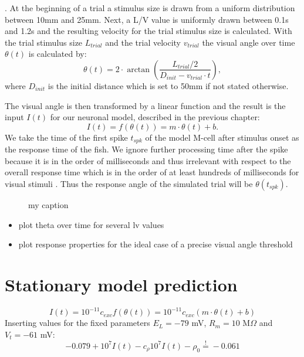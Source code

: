 \documentclass[a4paper,10pt,hidelinks]{scrreprt}
\begin{document}
	\cite{Bhattacharyya2017}.
	At the beginning of a trial a stimulus size is drawn from a uniform distribution between 10mm 
	and 25mm.
	Next, a L/V value is uniformly drawn between 0.1s and 1.2s and the resulting velocity for the 
	trial stimulus size is calculated.
	With the trial stimulus size $L_{trial}$ and the trial velocity $v_{trial}$ the visual angle 
	over time $\theta(t)$ is calculated by:
	\begin{equation}
	\theta (t) = 2\cdot \arctan(\frac{L_{trial}/2}{D_{init} - v_{trial}\cdot t}),
	\label{eq:theta}
	\end{equation}
	where $D_{init}$ is the initial distance which is set to 50mm if not stated otherwise.
	
	The visual angle is then transformed by a linear function and the result is the input $I(t)$ 
	for our neuronal model, described in the previous chapter:
	\begin{equation}
	I(t) = f(\theta (t)) = m \cdot \theta(t) + b.
	\label{eq:input}
	\end{equation}
	We take the time of the first spike $t_{spk}$ of the model M-cell after stimulus onset as the 
	response time of the fish.
	We ignore further processing time after the spike because it is in the order of milliseconds 
	\citep{Preuss2003} and thus irrelevant with respect to the overall response time which is in 
	the order of at least hundreds of milliseconds for visual stimuli \citep{Preuss2006}.
	Thus the response angle of the simulated trial will be $\theta (t_{spk})$.

	\begin{figure}
			\begin{center}
				
				\caption{my caption}	
			\end{center}
	\end{figure}
	
	\begin{itemize}
		\item plot theta over time for several lv values
		\item plot response properties for the ideal case of a precise visual angle threshold
	\end{itemize}	
	\section{Stationary model prediction}
	\begin{equation}
	I(t) = 10^{-11} c_{exc} f(\theta(t)) = 10^{-11} c_{exc} (m \cdot \theta(t) 
	+ b)
	\end{equation}
	Inserting values for the fixed parameters $E_{L}=-79$ mV, $R_{m}=10$ 
	M$\Omega$ 
	and $V_{t}=-61$ mV:
	\begin{equation}
	-0.079 + 10^{7} I(t) - c_{\rho} 10^{7} I(t) - \rho_{0} \overset{!}{=} -0.061
	\end{equation}
	
\end{document}
